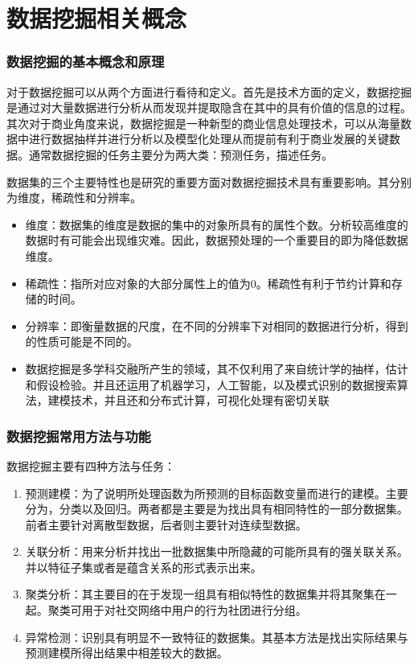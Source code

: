 \chapter{数据挖掘相关概念}
\subsection{数据挖掘的基本概念和原理}

对于数据挖掘可以从两个方面进行看待和定义。首先是技术方面的定义，数据挖掘是通过对大量数据进行分析从而发现并提取隐含在其中的具有价值的信息的过程。其次对于商业角度来说，数据挖掘是一种新型的商业信息处理技术，可以从海量数据中进行数据抽样并进行分析以及模型化处理从而提前有利于商业发展的关键数据。通常数据挖掘的任务主要分为两大类：预测任务，描述任务。
\par
数据集的三个主要特性也是研究的重要方面对数据挖掘技术具有重要影响。其分别为维度，稀疏性和分辨率。
\begin{itemize}
	\item 维度：数据集的维度是数据的集中的对象所具有的属性个数。分析较高维度的数据时有可能会出现维灾难。因此，数据预处理的一个重要目的即为降低数据维度。
	\item 稀疏性：指所对应对象的大部分属性上的值为0。稀疏性有利于节约计算和存储的时间。
	\item 分辨率：即衡量数据的尺度，在不同的分辨率下对相同的数据进行分析，得到的性质可能是不同的。
	\item 数据挖掘是多学科交融所产生的领域，其不仅利用了来自统计学的抽样，估计和假设检验。并且还运用了机器学习，人工智能，以及模式识别的数据搜索算法，建模技术，并且还和分布式计算，可视化处理有密切关联
\end{itemize}

\subsection{数据挖掘常用方法与功能}
数据挖掘主要有四种方法与任务：
\begin{enumerate}
	\item 预测建模：为了说明所处理函数为所预测的目标函数变量而进行的建模。主要分为，分类以及回归。两者都是主要是为找出具有相同特性的一部分数据集。前者主要针对离散型数据，后者则主要针对连续型数据。
	\item 关联分析：用来分析并找出一批数据集中所隐藏的可能所具有的强关联关系。并以特征子集或者是蕴含关系的形式表示出来。
	\item 聚类分析：其主要目的在于发现一组具有相似特性的数据集并将其聚集在一起。聚类可用于对社交网络中用户的行为社团进行分组。
	\item 异常检测：识别具有明显不一致特征的数据集。其基本方法是找出实际结果与预测建模所得出结果中相差较大的数据。
\end{enumerate}


